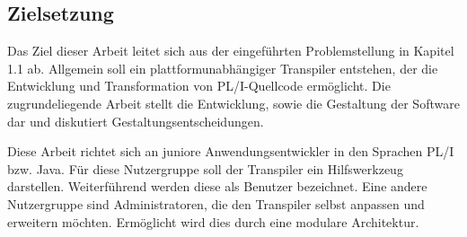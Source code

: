      




% 	 
%	 
%
 \pagebreak
\subsection{Zielsetzung}
Das Ziel dieser Arbeit leitet sich aus der eingeführten Problemstellung in Kapitel 1.1 ab. Allgemein soll ein plattformunabhängiger Transpiler entstehen, der die  Entwicklung und Transformation von PL/I-Quellcode ermöglicht. Die zugrundeliegende Arbeit stellt die Entwicklung, sowie die Gestaltung der Software dar und diskutiert Gestaltungsentscheidungen. 

Diese Arbeit richtet sich an juniore Anwendungsentwickler in den Sprachen PL/I bzw. Java. Für diese Nutzergruppe soll der Transpiler ein Hilfswerkzeug darstellen. Weiterführend werden diese als Benutzer bezeichnet. Eine andere Nutzergruppe sind Administratoren, die den Transpiler selbst anpassen und erweitern möchten. Ermöglicht wird dies durch eine modulare Architektur.
	
